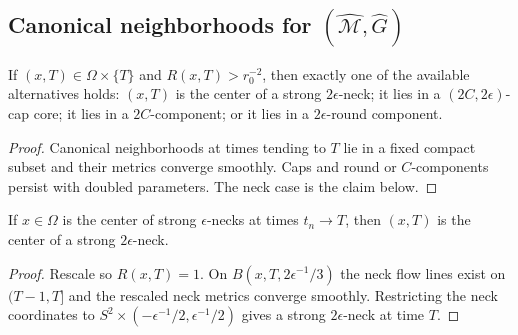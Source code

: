 \subsection{Canonical neighborhoods for $(\widehat{\mathcal M},\widehat G)$}
\begin{lemma}
\label{lem:canonical-neighborhoods-at-time-T}\label{omegacanon}

If $(x,T)\in\Omega\times\{T\}$ and $R(x,T)>r_0^{-2}$, then exactly one of
the available alternatives holds: $(x,T)$ is the center of a strong
$2\epsilon$-neck; it lies in a $(2C,2\epsilon)$-cap core; it lies in a
$2C$-component; or it lies in a $2\epsilon$-round component.
\end{lemma}
\begin{proof}
\sketch Canonical neighborhoods at times tending to $T$ lie in a fixed
compact subset and their metrics converge smoothly. Caps and round or
$C$-components persist with doubled parameters. The neck case is the claim
below.\end{proof}

\begin{claim}
\label{claim:limit-of-necks-is-neck}\label{epslimit}
If $x\in\Omega$ is the center of strong $\epsilon$-necks at times
$t_n\to T$, then $(x,T)$ is the center of a strong $2\epsilon$-neck.
\end{claim}
\begin{proof}\sketch Rescale so $R(x,T)=1$. On
$B(x,T,2\epsilon^{-1}/3)$ the neck flow lines exist on $(T-1,T]$ and the
rescaled neck metrics converge smoothly. Restricting the neck coordinates to
$S^2\times(-\epsilon^{-1}/2,\epsilon^{-1}/2)$ gives a strong
$2\epsilon$-neck at time $T$.\end{proof}

